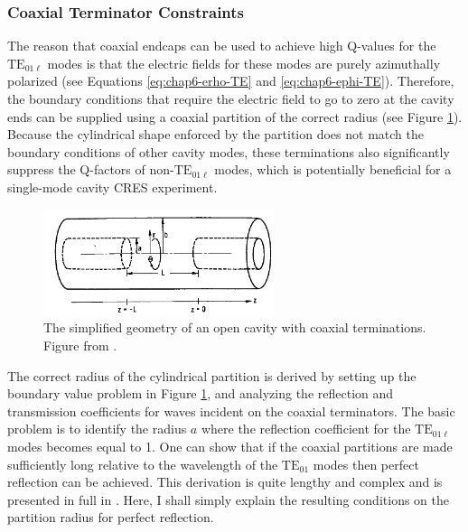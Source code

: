 \subsubsection*{Coaxial Terminator Constraints}

The reason that coaxial endcaps can be used to achieve high Q-values for the $\mathrm{TE}_{01\ell}$ modes is that the electric fields for these modes are purely azimuthally polarized (see Equations \ref{eq:chap6-erho-TE} and \ref{eq:chap6-ephi-TE}). Therefore, the boundary conditions that require the electric field to go to zero at the cavity ends can be supplied using a coaxial partition of the correct radius (see Figure \ref{fig:chap6-open-cavity-sketch}). Because the cylindrical shape enforced by the partition does not match the boundary conditions of other cavity modes, these terminations also significantly suppress the Q-factors of non-$\mathrm{TE}_{01\ell}$ modes, which is potentially beneficial for a single-mode cavity CRES experiment.  
\begin{figure}[htbp]
    \centering
    \includegraphics*[width=0.6\textwidth]{figs/Chapter-6/230606_open_cavity_sketch.png}
    \caption{\label{fig:chap6-open-cavity-sketch} The simplified geometry of an open cavity with coaxial terminations. Figure from \cite{nasa_cavity_theory}.}
\end{figure}

The correct radius of the cylindrical partition is derived by setting up the boundary value problem in Figure \ref{fig:chap6-open-cavity-sketch}, and analyzing the reflection and transmission coefficients for waves incident on the coaxial terminators. The basic problem is to identify the radius $a$ where the reflection coefficient for the $\mathrm{TE}_{01\ell}$ modes becomes equal to 1. One can show that if the coaxial partitions are made sufficiently long relative to the wavelength of the $\mathrm{TE}_{01}$ modes then perfect reflection can be achieved. This derivation is quite lengthy and complex and is presented in full in \cite{nasa_cavity_theory}. Here, I shall simply explain the resulting conditions on the partition radius for perfect reflection.

